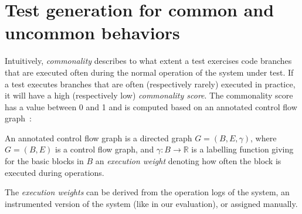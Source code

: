 
\section{Test generation for common and uncommon behaviors}
\label{sec:cub:approach}


Intuitively, \emph{commonality} describes to what extent a test exercises code branches that are executed often during the normal operation of the system under test. If a test executes branches that are often (respectively rarely) executed in practice, it will have a high (respectively low) \emph{commonality score}. The commonality score has a value between 0 and 1 and is computed based on an annotated control flow graph~\cite{Allen:1970:CFA:800028.808479}:
\begin{definition}
    An annotated control flow graph is a directed graph $G = (B, E, \gamma)$, where $G=(B,E)$ is a control flow graph, and $\gamma: B \rightarrow \mathbb{R}$ is a labelling function giving for the basic blocks in $B$ an \emph{execution weight} denoting how often the block is executed during operations.
\end{definition}
%
The \emph{execution weights} can be derived from the operation logs of the system, an instrumented version of the system (like in our evaluation), or assigned manually. 

